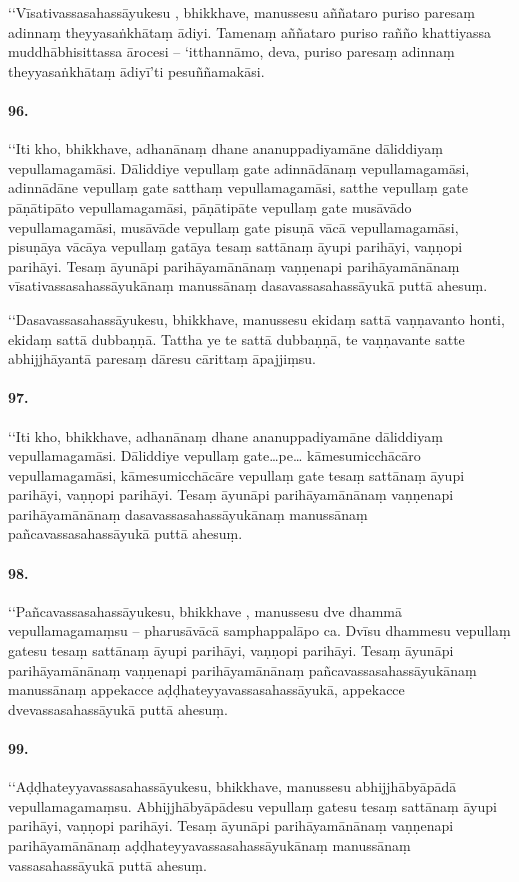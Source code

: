 ‘‘Vīsativassasahassāyukesu , bhikkhave, manussesu aññataro puriso paresaṃ adinnaṃ theyyasaṅkhātaṃ ādiyi. Tamenaṃ aññataro puriso rañño khattiyassa muddhābhisittassa ārocesi – ‘itthannāmo, deva, puriso paresaṃ adinnaṃ theyyasaṅkhātaṃ ādiyī’ti pesuññamakāsi.

\paragraph{96.} ‘‘Iti kho, bhikkhave, adhanānaṃ dhane ananuppadiyamāne dāliddiyaṃ vepullamagamāsi. Dāliddiye vepullaṃ gate adinnādānaṃ vepullamagamāsi, adinnādāne vepullaṃ gate satthaṃ vepullamagamāsi, satthe vepullaṃ gate pāṇātipāto vepullamagamāsi, pāṇātipāte vepullaṃ gate musāvādo vepullamagamāsi, musāvāde vepullaṃ gate pisuṇā vācā vepullamagamāsi, pisuṇāya vācāya vepullaṃ gatāya tesaṃ sattānaṃ āyupi parihāyi, vaṇṇopi parihāyi. Tesaṃ āyunāpi parihāyamānānaṃ vaṇṇenapi parihāyamānānaṃ vīsativassasahassāyukānaṃ manussānaṃ dasavassasahassāyukā puttā ahesuṃ.

‘‘Dasavassasahassāyukesu, bhikkhave, manussesu ekidaṃ sattā vaṇṇavanto honti, ekidaṃ sattā dubbaṇṇā. Tattha ye te sattā dubbaṇṇā, te vaṇṇavante satte abhijjhāyantā paresaṃ dāresu cārittaṃ āpajjiṃsu.

\paragraph{97.} ‘‘Iti kho, bhikkhave, adhanānaṃ dhane ananuppadiyamāne dāliddiyaṃ vepullamagamāsi. Dāliddiye vepullaṃ gate…pe… kāmesumicchācāro vepullamagamāsi, kāmesumicchācāre vepullaṃ gate tesaṃ sattānaṃ āyupi parihāyi, vaṇṇopi parihāyi. Tesaṃ āyunāpi parihāyamānānaṃ vaṇṇenapi parihāyamānānaṃ dasavassasahassāyukānaṃ manussānaṃ pañcavassasahassāyukā puttā ahesuṃ.

\paragraph{98.} ‘‘Pañcavassasahassāyukesu, bhikkhave , manussesu dve dhammā vepullamagamaṃsu – pharusāvācā samphappalāpo ca. Dvīsu dhammesu vepullaṃ gatesu tesaṃ sattānaṃ āyupi parihāyi, vaṇṇopi parihāyi. Tesaṃ āyunāpi parihāyamānānaṃ vaṇṇenapi parihāyamānānaṃ pañcavassasahassāyukānaṃ manussānaṃ appekacce aḍḍhateyyavassasahassāyukā, appekacce dvevassasahassāyukā puttā ahesuṃ.

\paragraph{99.} ‘‘Aḍḍhateyyavassasahassāyukesu, bhikkhave, manussesu abhijjhābyāpādā vepullamagamaṃsu. Abhijjhābyāpādesu vepullaṃ gatesu tesaṃ sattānaṃ āyupi parihāyi, vaṇṇopi parihāyi. Tesaṃ āyunāpi parihāyamānānaṃ vaṇṇenapi parihāyamānānaṃ aḍḍhateyyavassasahassāyukānaṃ manussānaṃ vassasahassāyukā puttā ahesuṃ.

